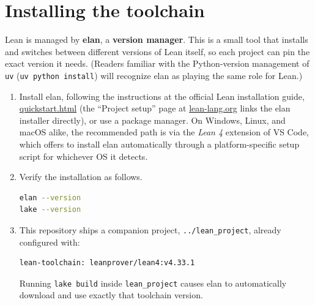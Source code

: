 \section{Installing the toolchain}\label{sec:00-setup:02-installing-toolchain:1}

Lean is managed by \textbf{elan}, a \textbf{version manager}. This is a small tool that installs and switches between different versions of Lean itself, so each project can pin the exact version it needs. (Readers familiar with the Python-version management of \texttt{uv} (\texttt{uv python install}) will recognize elan as playing the same role for Lean.)

\begin{enumerate}
\def\labelenumi{\arabic{enumi}.}
\item
  Install elan, following the instructions at the official Lean installation guide, \href{https://lean-lang.org/lean4/doc/quickstart.html}{quickstart.html} (the ``Project setup'' page at \href{https://lean-lang.org/}{lean-lang.org} links the elan installer directly), or use a package manager. On Windows, Linux, and macOS alike, the recommended path is via the \emph{Lean 4} extension of VS Code, which offers to install elan automatically through a platform-specific setup script for whichever OS it detects.
\item
  Verify the installation as follows.

\begin{lstlisting}[language=sh]
elan --version
lake --version
\end{lstlisting}
\item
  This repository ships a companion project, \texttt{../\allowbreak{}lean\_\allowbreak{}project}, already configured with:

\begin{lstlisting}
lean-toolchain: leanprover/lean4:v4.33.1
\end{lstlisting}

  Running \texttt{lake build} inside \texttt{lean\_\allowbreak{}project} causes elan to automatically download and use exactly that toolchain version.
\end{enumerate}

